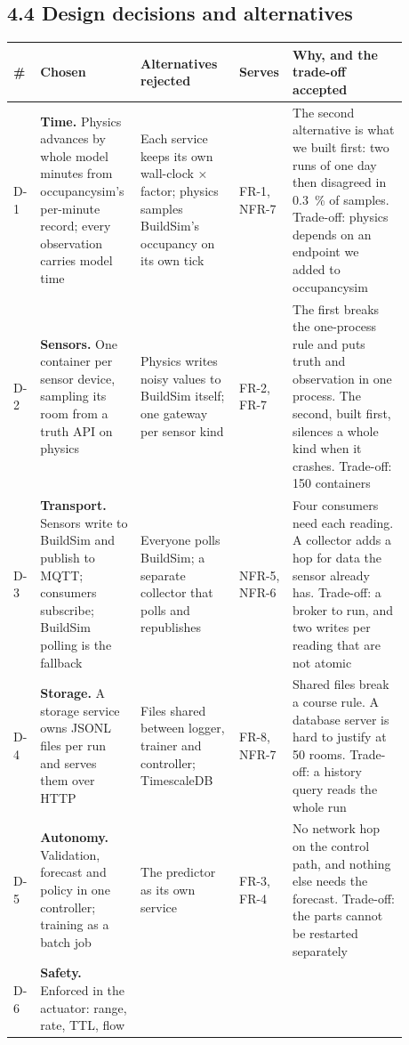 \subsection{4.4 Design decisions and alternatives}

\begin{longtable}[]{@{}L{0.05\linewidth}L{0.24\linewidth}L{0.24\linewidth}L{0.07\linewidth}L{0.28\linewidth}@{}}
\toprule
\textbf{\#} & \textbf{Chosen} & \textbf{Alternatives rejected} & \textbf{Serves} & \textbf{Why, and the trade-off accepted} \\
\midrule
\endhead
D-1 & \textbf{Time.} Physics advances by whole model minutes from
occupancysim's per-minute record; every observation carries model time &
Each service keeps its own wall-clock × factor; physics samples BuildSim's
occupancy on its own tick & FR-1, NFR-7 & The second alternative is what we
built first: two runs of one day then disagreed in 0.3~\% of samples.
Trade-off: physics depends on an endpoint we added to occupancysim \\
D-2 & \textbf{Sensors.} One container per sensor device, sampling its room
from a truth API on physics & Physics writes noisy values to BuildSim itself;
one gateway per sensor kind & FR-2, FR-7 & The first breaks the one-process
rule and puts truth and observation in one process. The second, built first,
silences a whole kind when it crashes. Trade-off: 150 containers \\
D-3 & \textbf{Transport.} Sensors write to BuildSim and publish to MQTT;
consumers subscribe; BuildSim polling is the fallback & Everyone polls
BuildSim; a separate collector that polls and republishes & NFR-5, NFR-6 &
Four consumers need each reading. A collector adds a hop for data the sensor
already has. Trade-off: a broker to run, and two writes per reading that are
not atomic \\
D-4 & \textbf{Storage.} A storage service owns JSONL files per run and serves
them over HTTP & Files shared between logger, trainer and controller;
TimescaleDB & FR-8, NFR-7 & Shared files break a course rule. A database
server is hard to justify at 50 rooms. Trade-off: a history query reads the
whole run \\
D-5 & \textbf{Autonomy.} Validation, forecast and policy in one controller;
training as a batch job & The predictor as its own service & FR-3, FR-4 & No
network hop on the control path, and nothing else needs the forecast.
Trade-off: the parts cannot be restarted separately \\
D-6 & \textbf{Safety.} Enforced in the actuator: range, rate, TTL, flow

\end{longtable}
